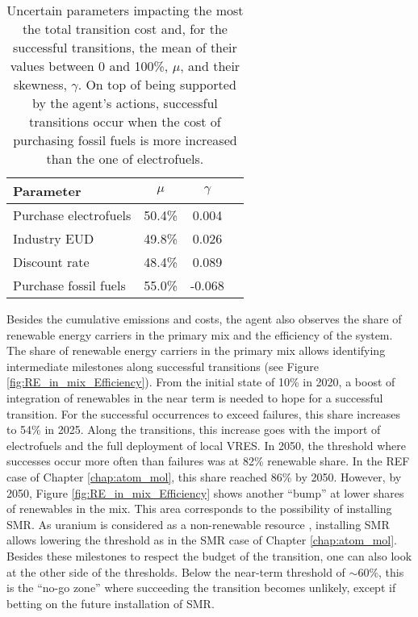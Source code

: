 \begin{table}[htbp!]
\caption{Uncertain parameters impacting the most the total transition cost and, for the successful transitions, the mean of their values between 0 and 100\%, $\mu$, and their skewness, $\gamma$. On top of being supported by the agent's actions, successful transitions occur when the cost of purchasing fossil fuels is more increased than the one of electrofuels.}
\label{tab:param_RL}
\centering
\begin{tabular}{l c c c}
\toprule
\textbf{Parameter}  & \textbf{$\mu$} & \textbf{$\gamma$}  \\	
\midrule
Purchase electrofuels & 50.4\% & 0.004  \\
Industry EUD & 49.8\% & 0.026 \\
Discount rate & 48.4\% & 0.089\\
Purchase fossil fuels  & 55.0\% & -0.068\\
\bottomrule							

\end{tabular}
\end{table}

Besides the cumulative emissions and costs, the agent also observes the share of renewable energy carriers in the primary mix and the efficiency of the system. The share of renewable energy carriers in the primary mix allows identifying intermediate milestones along successful transitions (see Figure \ref{fig:RE_in_mix_Efficiency}). From the initial state of 10\% in 2020, a boost of integration of renewables in the near term is needed to hope for a successful transition. For the successful occurrences to exceed failures, this share increases to 54\% in 2025. Along the transitions, this increase goes with the import of electrofuels and the full deployment of local \gls{VRES}. In 2050, the threshold where successes occur more often than failures was at 82\% renewable share. In the REF case of Chapter \ref{chap:atom_mol}, this share reached 86\% by 2050. However, by 2050, Figure \ref{fig:RE_in_mix_Efficiency} shows another ``bump'' at lower shares of renewables in the mix. This area corresponds to the possibility of installing \gls{SMR}. As uranium is considered as a non-renewable resource \cite{rixhon2021terminology}, installing \gls{SMR} allows lowering the threshold as in the SMR case of Chapter \ref{chap:atom_mol}. Besides these milestones to respect the  budget of the transition, one can also look at the other side of the thresholds. Below the near-term threshold of $\sim$60\%, this is the ``no-go zone'' where succeeding the transition becomes unlikely, except if betting on the future installation of \gls{SMR}.


